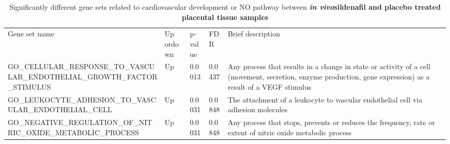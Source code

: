 \documentclass[authordate, empirical]{jote-new-article}
\begin{document}
\begin{table}[h!]
  \begin{fullwidth}
    \caption{Significantly different gene sets related to cardiovascular development or NO pathway between \emph{\textbf{in vivo}}\textbf{sildenafil and placebo treated placental tissue samples}}

    \begin{tabularx}{\linewidth}{@{} X l l l X @{}}
      Gene set name                                                               & Up ordown                                                                                                   & p-value                                                                                                                                                      & FDR    & Brief description                                                                                                              \\

      GO\_CELLULAR\_RESPONSE\_TO\_VASCULAR\_ENDOTHELIAL\_GROWTH\_FACTOR\_STIMULUS & Up                                                                                                          &
      0.0013                                                                      & 0.0437                                                                                                      & Any process that results in a change in state or activity of a cell (movement, secretion, enzyme production, gene expression) as a result of a VEGF stimulus
      \\

      GO\_LEUKOCYTE\_ADHESION\_TO\_VASCULAR\_ENDOTHELIAL\_CELL                    & Up                                                                                                          & 0.0031                                                                                                                                                       & 0.0848
                                                                                  & The attachment of a leukocyte to vascular endothelial cell via adhesion molecules
      \\

      GO\_NEGATIVE\_REGULATION\_OF\_NITRIC\_OXIDE\_METABOLIC\_PROCESS             & Up                                                                                                          & 0.0031                                                                                                                                                       & 0.0848
                                                                                  & Any process that stops, prevents or reduces the frequency, rate or extent of nitric oxide metabolic process
      \\


\end{tabularx}
\end{fullwidth}
\end{table}
\end{document}
